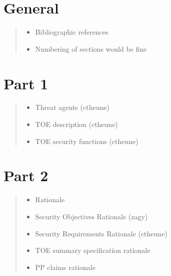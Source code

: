 \documentclass[10pt,a4paper,english]{book}
\begin{document}
\hypertarget{general}{}
\section{General}
\begin{quote}
\begin{itemize}
\item {} 
Bibliographic references

\item {} 
Numbering of sections would be fine

\end{itemize}
\end{quote}



\hypertarget{part-1}{}
\section{Part 1}
\begin{quote}
\begin{itemize}
\item {} 
Threat agents (ctheune)

\item {} 
TOE description (ctheune)

\item {} 
TOE security functions (ctheune)

\end{itemize}
\end{quote}



\hypertarget{part-2}{}
\section{Part 2}
\begin{quote}
\begin{itemize}
\item {} 
Rationale

\item {} 
Security Objectives Rationale (zagy)

\item {} 
Security Requirements Rationale (ctheune)

\item {} 
TOE summary specification rationale

\item {} 
PP claims rationale

\end{itemize}
\end{quote}
\end{document}
